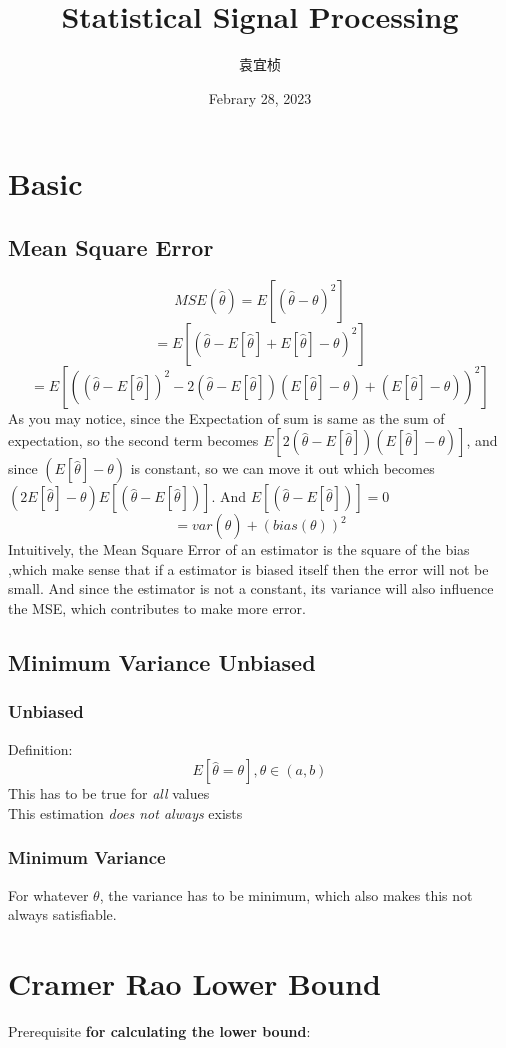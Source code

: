 \documentclass{article}
\title{Statistical Signal Processing}
\author{袁宜桢}
\date{Febrary 28, 2023}
\begin{document}
\maketitle
\section{Basic}
\subsection{Mean Square Error}
$$ MSE(\hat{\theta})=E[(\hat{\theta}-\theta)^2] $$
$$ =E[(\hat{\theta}-E[\hat{\theta}]+E[\hat{\theta}]-\theta)^2] $$
$$ =E[((\hat{\theta}-E[\hat{\theta}])^2-2(\hat{\theta}-E[\hat{\theta}])(E[\hat{\theta
}]-\theta)+(E[\hat{\theta}]-\theta))^2] $$
As you may notice, since the Expectation of sum is same as the sum of expectation, so the second term becomes
$E[2(\hat{\theta}-E[\hat{\theta}])(E[\hat{\theta}]-\theta)]$, and since $(E[\hat{\theta}]-\theta)$ is constant, so we can move it out which becomes$(2E[\hat{\theta}]-\theta)E[(\hat{\theta}-E[\hat{\theta}])]$. And $E[(\hat{\theta}-E[\hat{\theta}])]=0$
$$ =var(\hat{\theta})+(bias(\theta))^2 $$
Intuitively, the Mean Square Error of an estimator is the square of the bias
,which make sense that if a estimator is biased itself then the error will not be small.
And since the estimator is not a constant, its variance will also influence the MSE,
which contributes to make more error.


\subsection{Minimum Variance Unbiased}
\subsubsection{Unbiased}
Definition:
$$ E[\hat{\theta}=\theta],\theta\in (a,b) $$
This has to be true for \textit{all} values\\
This estimation \textit{does not always} exists
\subsubsection{Minimum Variance}
For whatever $\theta$, the variance has to be minimum, which also makes this not always satisfiable.\\

\section{Cramer Rao Lower Bound}
Prerequisite \textbf{for calculating the lower bound}:\\
\end{document}
